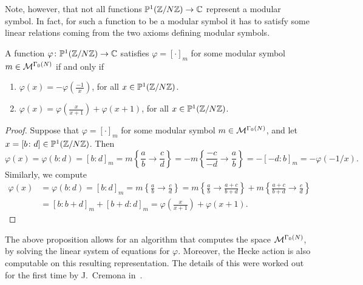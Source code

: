 Note, however, that not all functions $\mathbb{P}^1(\mathbb{Z}/N\mathbb{Z})\to\mathbb{C}$ represent a modular symbol. In fact, for such a function to be a modular symbol it has to satisfy some linear relations coming from the two axioms defining modular symbols.
\begin{proposition}
\label{prop:msym-relations}
  A function $\varphi\colon \mathbb{P}^1(\mathbb{Z}/N\mathbb{Z})\to \mathbb{C}$ satisfies $\varphi=[\cdot]_m$ for some modular symbol $m\in\mathcal{M}^{\Gamma_0(N)}$ if and only if
  \begin{enumerate}
  \item $\varphi(x) = -\varphi(\frac{-1}{x})$,  for all $x\in\mathbb{P}^1(\mathbb{Z}/N\mathbb{Z})$.
  \item $\varphi(x) = \varphi(\frac{x}{x+1}) + \varphi(x+1)$, for all $x\in \mathbb{P}^1(\mathbb{Z}/N\mathbb{Z})$.
  \end{enumerate}
\end{proposition}
\begin{proof}
  Suppose that $\varphi=[\cdot]_m$ for some modular symbol $m\in\mathcal{M}^{\Gamma_0(N)}$, and let $x=[b\colon d]\in \mathbb{P}^1(\mathbb{Z}/N\mathbb{Z})$. Then
\[
\varphi(x)=\varphi(b\colon d) = [b\colon d]_m = m\left\{\frac ab\to \frac cd\right\} = -m\left\{\frac{-c}{-d}\to \frac ab\right\} = -[-d\colon b]_m=-\varphi(-1/x).
\]
Similarly, we compute
\begin{align*}
\varphi(x)&=\varphi(b\colon d) = [b\colon d]_m = m\left\{\frac ab\to \frac cd\right\} = m\left\{\frac ab\to\frac{a+c}{b+d}\right\} + m\left\{\frac{a+c}{b+d}\to \frac cd\right\}\\
&=[b\colon b+d]_m+[b+d\colon d]_m = \varphi\left(\frac{x}{x+1}\right) + \varphi(x+1).
\end{align*}
\end{proof}

The above proposition allows for an algorithm that computes the space $\mathcal{M}^{\Gamma_0(N)}$, by solving the linear system of equations for $\varphi$. Moreover, the Hecke action is also computable on this resulting representation. The details of this were worked out for the first time by J.~Cremona in~\cite{cremona-book}.


